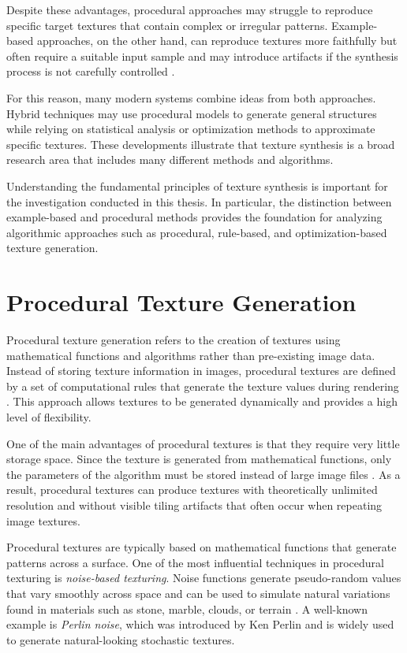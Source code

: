 Despite these advantages, procedural approaches may struggle to reproduce specific target textures that contain complex or irregular patterns. Example-based approaches, on the other hand, can reproduce textures more faithfully but often require a suitable input sample and may introduce artifacts if the synthesis process is not carefully controlled \cite{ebert2003texturing}.

For this reason, many modern systems combine ideas from both approaches. Hybrid techniques may use procedural models to generate general structures while relying on statistical analysis or optimization methods to approximate specific textures. These developments illustrate that texture synthesis is a broad research area that includes many different methods and algorithms.

Understanding the fundamental principles of texture synthesis is important for the investigation conducted in this thesis. In particular, the distinction between example-based and procedural methods provides the foundation for analyzing algorithmic approaches such as procedural, rule-based, and optimization-based texture generation.

\clearpage
\section{Procedural Texture Generation}

Procedural texture generation refers to the creation of textures using mathematical functions and algorithms rather than pre-existing image data. Instead of storing texture information in images, procedural textures are defined by a set of computational rules that generate the texture values during rendering \cite{ebert2003texturing}. This approach allows textures to be generated dynamically and provides a high level of flexibility.

One of the main advantages of procedural textures is that they require very little storage space. Since the texture is generated from mathematical functions, only the parameters of the algorithm must be stored instead of large image files \cite{akenine2018realtime}. As a result, procedural textures can produce textures with theoretically unlimited resolution and without visible tiling artifacts that often occur when repeating image textures.

Procedural textures are typically based on mathematical functions that generate patterns across a surface. One of the most influential techniques in procedural texturing is \textit{noise-based texturing}. Noise functions generate pseudo-random values that vary smoothly across space and can be used to simulate natural variations found in materials such as stone, marble, clouds, or terrain \cite{ebert2003texturing}. A well-known example is \textit{Perlin noise}, which was introduced by Ken Perlin and is widely used to generate natural-looking stochastic textures.

